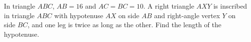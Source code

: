 In triangle $ABC$, $AB=16$ and $AC=BC=10$. A right triangle $AXY$ is inscribed in triangle $ABC$ with hypotenuse $AX$ on side $AB$ and right-angle vertex $Y$ on side $BC$, and one leg is twice as long as the other. Find the length of the hypotenuse.
